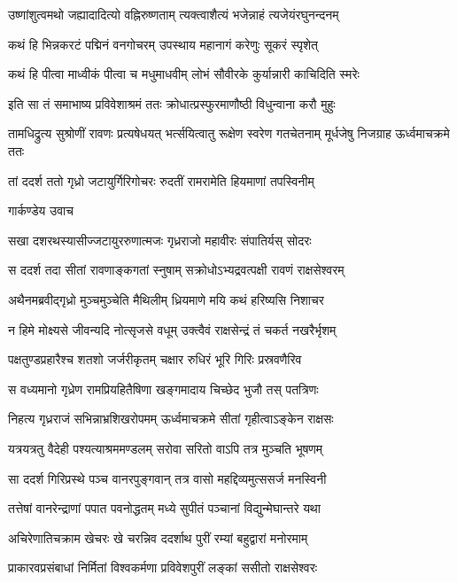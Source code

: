 \twolineshloka
{उष्णांशुत्वमथो जह्यादादित्यो वह्निरुष्णताम्}
{त्यक्त्वाशैत्यं भजेन्नाहं त्यजेयंरघुनन्दनम्}


\twolineshloka
{कथं हि भिन्नकरटं पद्मिनं वनगोचरम्}
{उपस्थाय महानागं करेणुः सूकरं स्पृशेत्}


\twolineshloka
{कथं हि पीत्वा माध्वीकं पीत्वा च मधुमाधवीम्}
{लोभं सौवीरके कुर्यान्नारी काचिदिति स्मरेः}


\twolineshloka
{इति सा तं समाभाष्य प्रविवेशाश्रमं ततः}
{क्रोधात्प्रस्फुरमाणौष्ठी विधुन्वाना करौ मुहुः}


तामधिद्रुत्य सुश्रोणीं रावणः प्रत्यषेधयत्
\twolineshloka
{भर्त्सयित्वातु रूक्षेण स्वरेण गतचेतनाम्}
{मूर्धजेषु निजग्राह ऊर्ध्वमाचक्रमे ततः}


\twolineshloka
{तां ददर्श ततो गृध्रो जटायुर्गिरिगोचरः}
{रुदतीं रामरामेति हियमाणां तपस्विनीम्}


\twolineshloka
{गार्कण्डेय उवाच}
{}


\twolineshloka
{सखा दशरथस्यासीज्जटायुररुणात्मजः}
{गृध्रराजो महावीरः संपातिर्यस् सोदरः}


\twolineshloka
{स ददर्श तदा सीतां रावणाङ्कगतां स्नुषाम्}
{सक्रोधोऽभ्यद्रवत्पक्षी रावणं राक्षसेश्वरम्}


\twolineshloka
{अथैनमब्रवीद्गृध्रो मुञ्चमुञ्चेति मैथिलीम्}
{ध्रियमाणे मयि कथं हरिष्यसि निशाचर}


\twolineshloka
{न हिमे मोक्ष्यसे जीवन्यदि नोत्सृजसे वधूम्}
{उक्त्वैवं राक्षसेन्द्रं तं चकर्त नखरैर्भृशम्}


\twolineshloka
{पक्षतुण्डप्रहारैश्च शतशो जर्जरीकृतम्}
{चक्षार रुधिरं भूरि गिरिः प्रस्रवणैरिव}


\twolineshloka
{स वध्यमानो गृध्रेण रामप्रियहितैषिणा}
{खङ्गमादाय चिच्छेद भुजौ तस् पतत्रिणः}


\twolineshloka
{निहत्य गृध्रराजं सभिन्नाभ्रशिखरोपमम्}
{ऊर्ध्वमाचक्रमे सीतां गृहीत्वाऽङ्केन राक्षसः}


\twolineshloka
{यत्रयत्रतु वैदेही पश्यत्याश्रममण्डलम्}
{सरोवा सरितो वाऽपि तत्र मुञ्चति भूषणम्}


\twolineshloka
{सा ददर्श गिरिप्रस्थे पञ्च वानरपुङ्गवान्}
{तत्र वासो महद्दिव्यमुत्ससर्ज मनस्विनी}


\twolineshloka
{तत्तेषां वानरेन्द्राणां पपात पवनोद्धतम्}
{मध्ये सुपीतं पञ्चानां विद्युन्मेघान्तरे यथा}


\twolineshloka
{अचिरेणातिचक्राम खेचरः खे चरन्निव}
{ददर्शाथ पुरीं रम्यां बहुद्वारां मनोरमाम्}


\twolineshloka
{प्राकारवप्रसंबाधां निर्मितां विश्वकर्मणा}
{प्रविवेशपुरीं लङ्कां ससीतो राक्षसेश्वरः}


